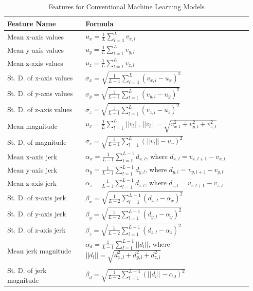 \documentclass[mnsc]{informs3b} %
\begin{document}
\begin{appendices}
\begin{table}[h]
\centering
\caption{Features for Conventional Machine Learning Models}
\label{tb:baseline_features}
\small
\begin{threeparttable}
\begin{tabular}{L{160pt}L{290pt}}
\toprule
 Feature Name & Formula \\ \midrule
 Mean x-axis values &  $u_{x} = \frac{1}{L} \sum_{l=1}^{L} v_{x,l}$ \\
 Mean y-axis values &  $u_{y} = \frac{1}{L} \sum_{l=1}^{L} v_{y,l}$ \\
 Mean z-axis values &  $u_{z} = \frac{1}{L} \sum_{l=1}^{L} v_{z,l}$ \\
 St. D. of x-axis values &  $\sigma_{x} = \sqrt{\frac{1}{L-1} \sum_{l=1}^{L} (v_{x,l} - u_{x} )^2 } $ \\
 St. D. of y-axis values &  $\sigma_{y} = \sqrt{\frac{1}{L-1} \sum_{l=1}^{L} (v_{y,l} - u_{y} )^2 } $ \\
 St. D. of z-axis values &  $\sigma_{z} = \sqrt{\frac{1}{L-1} \sum_{l=1}^{L} (v_{z,l} - u_{z} )^2 } $ \\
 Mean magnitude &  $u_{v} = \frac{1}{L} \sum_{l=1}^{L} ||v_l||$, $||v_l||=\sqrt{v_{x,l}^2+v_{y,l}^2+v_{z,l}^2} $ \\
 St. D. of magnitude &  $\sigma_{v} = \sqrt{\frac{1}{L-1} \sum_{l=1}^{L} (||v_l|| - u_v)^2 } $ \\
 Mean x-axis jerk & $\alpha_{x} = \frac{1}{L-1} \sum_{l=1}^{L-1} d_{x,l}$, where $d_{x,l}=v_{x,l+1}-v_{x,l}$ \\
 Mean y-axis jerk & $\alpha_{y} = \frac{1}{L-1} \sum_{l=1}^{L-1} d_{y,l}$, where $d_{y,l}=v_{y,l+1}-v_{y,l}$  \\
 Mean z-axis jerk & $\alpha_{z} = \frac{1}{L-1} \sum_{l=1}^{L-1} d_{z,l}$, where $d_{z,l}=v_{z,l+1}-v_{z,l}$  \\
 St. D. of x-axis jerk &  $\beta_{x} = \sqrt{\frac{1}{L-2} \sum_{l=1}^{L-1} (d_{x,l} - \alpha_{x} )^2 } $ \\
 St. D. of y-axis jerk &  $\beta_{y} = \sqrt{\frac{1}{L-2} \sum_{l=1}^{L-1} (d_{y,l} - \alpha_{y} )^2 } $ \\
 St. D. of z-axis jerk &  $\beta_{z} = \sqrt{\frac{1}{L-2} \sum_{l=1}^{L-1} (d_{z,l} - \alpha_{z} )^2 } $ \\
 Mean jerk magnitude &  $\alpha_{d} = \frac{1}{L-1} \sum_{l=1}^{L-1} ||d_l|| $, where $||d_l||=\sqrt{d_{x,l}^2+d_{y,l}^2+d_{z,l}^2}$ \\
 St. D. of jerk magnitude & $\beta_{d} = \sqrt{\frac{1}{L-2} \sum_{l=1}^{L-1} (||d_l|| - \alpha_{d})^2 } $  \\

\end{tabular}
\end{threeparttable}
\end{table}
\end{appendices}
\end{document}

